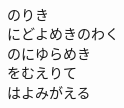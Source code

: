 \documentclass[10pt,b5j]{tarticle} %
\begin{document}
\begin{enumerate}
\begin{minipage}[c]{\blocksize}
        \vspace{\linespace}
        \item~\\
        のりき\\
        にどよめきのわく\\
        のにゆらめき\\
        をむえりて\\
        はよみがえる
    
    \end{minipage}
\end{enumerate} %
\end{document}
